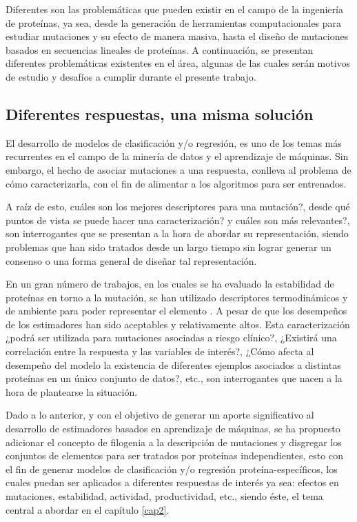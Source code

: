 Diferentes son las problemáticas que pueden existir en el campo de la ingeniería de proteínas, ya sea, desde la generación de herramientas computacionales para estudiar mutaciones y su efecto de manera masiva, hasta el diseño de mutaciones basados en secuencias lineales de proteínas. A continuación, se presentan diferentes problemáticas existentes en el área, algunas de las cuales serán motivos de estudio y desafíos a cumplir durante el presente trabajo.

\subsection{Diferentes respuestas, una misma solución}

El desarrollo de modelos de clasificación y/o regresión, es uno de los temas más recurrentes en el campo de la minería de datos y el aprendizaje de máquinas. Sin embargo, el hecho de asociar mutaciones a una respuesta, conlleva al problema de cómo caracterizarla, con el fin de alimentar a los algoritmos para ser entrenados. 

A raíz de esto, cuáles son los mejores descriptores para una mutación?, desde qué puntos de vista se puede hacer una caracterización? y cuáles son más relevantes?, son interrogantes que se presentan a la hora de abordar su representación, siendo problemas que han sido tratados desde un largo tiempo sin lograr generar un consenso o una forma general de diseñar tal representación. 

En un gran número de trabajos, en los cuales se ha evaluado la estabilidad de proteínas en torno a la mutación, se han utilizado descriptores termodinámicos y de ambiente para poder representar el elemento \cite{capriotti2005mutant2, capriotti2008three}. A pesar de que los desempeños de los estimadores han sido aceptables y relativamente altos. Esta caracterización ¿podrá ser utilizada para mutaciones asociadas a riesgo clínico?, ¿Existirá una correlación entre la respuesta y las variables de interés?, ¿Cómo afecta al desempeño del modelo la existencia de diferentes ejemplos asociados a distintas proteínas en un único conjunto de datos?, etc., son interrogantes que nacen a la hora de plantearse la situación.

Dado a lo anterior, y con el objetivo de generar un aporte significativo al desarrollo de estimadores basados en aprendizaje de máquinas, se ha propuesto adicionar el concepto de filogenia a la descripción de mutaciones y disgregar los conjuntos de elementos para ser tratados por proteínas independientes, esto con el fin de generar modelos de clasificación y/o regresión proteína-específicos, los cuales puedan ser aplicados a diferentes respuestas de interés ya sea: efectos en mutaciones, estabilidad, actividad, productividad, etc., siendo éste, el tema central a abordar en el capítulo \ref{cap2}.
 
